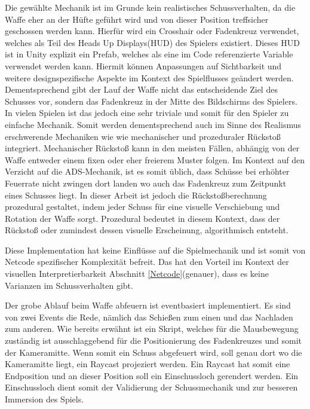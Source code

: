 Die gewählte Mechanik ist im Grunde kein realistisches Schussverhalten, da die Waffe eher an der Hüfte geführt wird und von dieser Position treffsicher geschossen werden kann. Hierfür wird ein Crosshair oder Fadenkreuz verwendet, welches als Teil des Heads Up Displays(HUD) des Spielers existiert. Dieses HUD ist in Unity explizit ein Prefab, welches als eine im Code referenzierte Variable verwendet werden kann. Hiermit können Anpassungen auf Sichtbarkeit und weitere designspezifische Aspekte im Kontext des Spielflusses geändert werden.
Dementsprechend gibt der Lauf der Waffe nicht das entscheidende Ziel des Schusses vor, sondern das Fadenkreuz in der Mitte des Bildschirms des Spielers. In vielen Spielen ist das jedoch eine sehr triviale und somit für den Spieler zu einfache Mechanik. Somit werden dementsprechend auch im Sinne des Realismus erschwerende Mechaniken wie wie mechanischer und prozeduraler Rückstoß integriert. Mechanischer Rückstoß kann in den meisten Fällen, abhängig von der Waffe entweder einem fixen oder eher freierem Muster folgen. Im Kontext auf den Verzicht auf die ADS-Mechanik, ist es somit üblich, dass Schüsse bei erhöhter Feuerrate nicht zwingen dort landen wo auch das Fadenkreuz zum Zeitpunkt eines Schusses liegt. 
In dieser Arbeit ist jedoch die Rückstoßberechnung prozedural gestaltet, indem jeder Schuss für eine visuelle Verschiebung und Rotation der Waffe sorgt. Prozedural bedeutet in diesem Kontext, dass der Rückstoß oder zumindest dessen visuelle Erscheinung, algorithmisch entsteht.


Diese Implementation hat keine Einflüsse auf die Spielmechanik und ist somit von Netcode spezifischer Komplexität befreit. Das hat den Vorteil im Kontext der visuellen Interpretierbarkeit Abschnitt \ref{Netcode}(genauer), dass es keine Varianzen im Schussverhalten gibt.

Der grobe Ablauf beim Waffe abfeuern ist eventbasiert implementiert. Es sind von zwei Events die Rede, nämlich das Schießen zum einen und das Nachladen zum anderen. 
Wie bereits erwähnt ist ein Skript, welches für die Mausbewegung zuständig ist ausschlaggebend für die Positionierung des Fadenkreuzes und somit der Kameramitte. 
Wenn somit ein Schuss abgefeuert wird, soll genau dort wo die Kameramitte liegt, ein Raycast projeziert werden. Ein Raycast hat somit eine Endposition und an dieser Position soll ein Einschussloch gerendert werden. Ein Einschussloch dient somit der Validierung der Schussmechanik und zur besseren Immersion des Spiels. 

